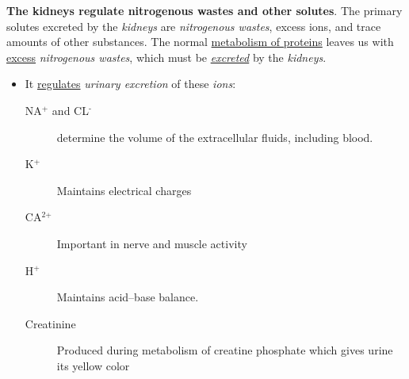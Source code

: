 \documentclass[11pt]{article}
\begin{document}
\textbf{The kidneys regulate nitrogenous wastes and other solutes}. The primary solutes
excreted by the \emph{kidneys} are \emph{nitrogenous wastes}, excess ions, and trace amounts
of other substances. The normal \uline{metabolism of proteins} leaves us with \uline{excess}
\emph{nitrogenous wastes}, which must be \emph{\uline{excreted}} by the \emph{kidneys}.

\begin{itemize}
\item It \uline{regulates} \emph{urinary excretion} of these \emph{ions}:
\begin{description}
\item[{NA\(^{\text{+}}\) and CL\(^{\text{-}}\)}] determine the volume of the extracellular fluids,
including blood.
\item[{K\(^{\text{+}}\)}] Maintains electrical charges
\item[{CA\(^{\text{2+}}\)}] Important in nerve and muscle activity
\item[{H\(^{\text{+}}\)}] Maintains acid--base balance.
\item[{Creatinine}] Produced during metabolism of creatine phosphate which gives
urine its yellow color
\end{description}
\end{itemize}
\end{document}
